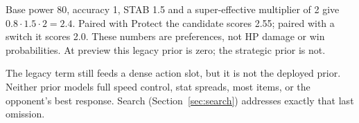 \begin{example}
Base power 80, accuracy 1, STAB 1.5 and a super-effective multiplier of 2 give
$0.8\cdot1.5\cdot2=2.4$. Paired with Protect the candidate scores 2.55; paired
with a switch it scores 2.0. These numbers are preferences, not HP damage or
win probabilities. At preview this legacy prior is zero; the strategic prior
is not.
\end{example}

The legacy term still feeds a dense action slot, but it is not the deployed
prior. Neither prior models full speed control, stat spreads, most items, or
the opponent's best response. Search (Section~\ref{sec:search}) addresses
exactly that last omission.

